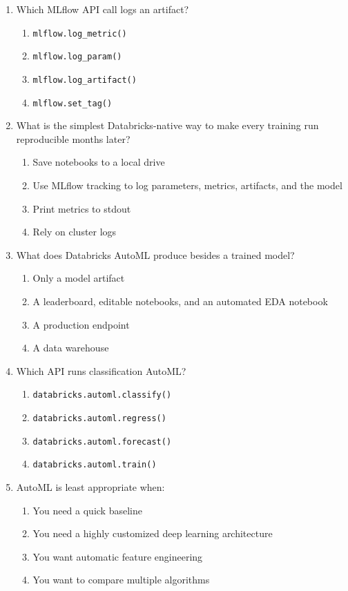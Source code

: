 \documentclass[11pt]{article}
\begin{document}
\begin{enumerate}[leftmargin=*, label=\textbf{Q\arabic*.}]
		\item Which MLflow API call logs an artifact?
		\begin{enumerate}[label=(\alph*)]
			\item \texttt{mlflow.log\_metric()}
			\item \texttt{mlflow.log\_param()}
			\item \texttt{mlflow.log\_artifact()}
			\item \texttt{mlflow.set\_tag()}
		\end{enumerate}
		
		\item What is the simplest Databricks-native way to make every training run reproducible months later?
		\begin{enumerate}[label=(\alph*)]
			\item Save notebooks to a local drive
			\item Use MLflow tracking to log parameters, metrics, artifacts, and the model
			\item Print metrics to stdout
			\item Rely on cluster logs
		\end{enumerate}
		
		\item What does Databricks AutoML produce besides a trained model?
		\begin{enumerate}[label=(\alph*)]
			\item Only a model artifact
			\item A leaderboard, editable notebooks, and an automated EDA notebook
			\item A production endpoint
			\item A data warehouse
		\end{enumerate}
		
		\item Which API runs classification AutoML?
		\begin{enumerate}[label=(\alph*)]
			\item \texttt{databricks.automl.classify()}
			\item \texttt{databricks.automl.regress()}
			\item \texttt{databricks.automl.forecast()}
			\item \texttt{databricks.automl.train()}
		\end{enumerate}
		
		\item AutoML is least appropriate when:
		\begin{enumerate}[label=(\alph*)]
			\item You need a quick baseline
			\item You need a highly customized deep learning architecture
			\item You want automatic feature engineering
			\item You want to compare multiple algorithms
		\end{enumerate}
		

\end{enumerate}
\end{document}
